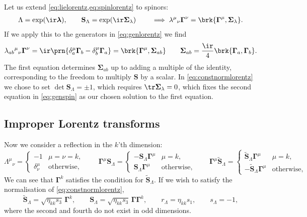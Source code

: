 \documentclass[11pt]{article}
\newcommand{\Gammab}{\boldsymbol{\Gamma}}
\renewcommand{\S}{\mathbf{S}}
\newcommand{\St}{\widetilde{\S}}
\newcommand{\Sigmab}{\boldsymbol{\Sigma}}
\newcommand{\lambdab}{\boldsymbol{\lambda}}
\begin{document}
Let us extend \cref{eq:lielorentz,eq:spinlorentz} to spinors:
%
\begin{equation}\label{eq:liespin}
\begin{aligned}
  \Lambda = \exp(\ir\lambdab),
  \qquad
  \S_\Lambda = \exp(\ir \Sigmab_\lambda)
  \qquad \implies
  \lambda^\mu{}_\nu \Gammab^\nu = \brk{\Gammab^\mu, \Sigmab_\lambda}.
\end{aligned}
\end{equation}
%
If we apply this to the generators in \cref{eq:genlorentz} we find
%
\begin{equation}\label{eq:genspin}
  \lambda_{ab}{}^\mu{}_\nu \Gammab^\nu
    = \ir \prn{\delta^\mu_a \Gammab_b - \delta^\mu_b \Gammab_a} 
    = \brk{\Gammab^\mu, \Sigmab_{ab}}
  \qquad
  \Sigmab_{ab} = \frac{\ir}{4}\brk{\Gammab_a, \Gammab_b}.
\end{equation}
%
The first equation determines \(\Sigmab_{ab}\) up to adding a multiple of the identity, corresponding to the freedom to multiply \(\S\) by a scalar.
In \cref{eq:constnormlorentz} we chose to set \(\det \S_\Lambda = \pm 1\), which requires \(\tr \Sigmab_\lambda = 0\), which fixes the second equation in \cref{eq:genspin} as our chosen solution to the first equation.



\subsection{Improper Lorentz transforms}\label{sec:reflectlorentz}

Now we consider a reflection in the \(k\)'th dimension:
%
\begin{equation*}
  \Lambda^\mu{}_\nu 
    = \begin{cases}
        -1 & \mu = \nu = k, \\
        \delta^\mu_\nu & \text{otherwise},
      \end{cases}
  \qquad
  \Gammab^\mu \S_\Lambda
  = \begin{cases}
    -\S_\Lambda \Gammab^\mu & \mu = k, \\
    \S_\Lambda \Gammab^\mu & \text{otherwise},
  \end{cases}
  \qquad
  \Gammab^\mu \St_\Lambda
  = \begin{cases}
    \St_\Lambda \Gammab^\mu & \mu = k, \\
    -\St_\Lambda \Gammab^\mu & \text{otherwise},
  \end{cases}
\end{equation*}
%
We can see that \(\Gammab^k\) satisfies the condition for \(\St_\Lambda\).
If we wish to satisfy the normalisation of \cref{eq:constnormlorentz},
%
\begin{equation}\label{eq:reflect}
  \St_\Lambda = \sqrt{\eta_{kk}s_3}\, \Gammab^k, \qquad
  \S_\Lambda = \sqrt{\eta_{kk}s_3}\, \Gammab \Gammab^k, \qquad
  r_\Lambda = \eta_{kk} s_1, \qquad
  s_\Lambda = -1, 
\end{equation}
%
where the second and fourth do not exist in odd dimensions.
\end{document}
